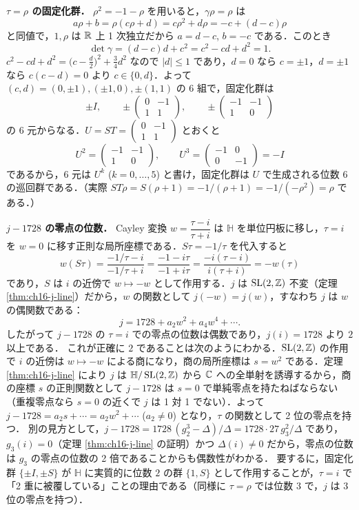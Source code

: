 \textbf{$\tau=\rho$ の固定化群．}
$\rho^2=-1-\rho$ を用いると，$\gamma\rho=\rho$ は
\[
a\rho+b=\rho(c\rho+d)=c\rho^2+d\rho=-c+(d-c)\rho
\]
と同値で，$1,\rho$ は $\mathbb{R}$ 上 1 次独立だから $a=d-c$, $b=-c$ である．このとき
\[
\det\gamma=(d-c)d+c^2=c^2-cd+d^2=1 .
\]
$c^2-cd+d^2=\bigl(c-\tfrac d2\bigr)^2+\tfrac34d^2$ なので $|d|\le1$ であり，$d=0$ なら $c=\pm1$，$d=\pm1$ なら $c(c-d)=0$ より $c\in\{0,d\}$．よって $(c,d)=(0,\pm1),(\pm1,0),\pm(1,1)$ の 6 組で，固定化群は
\[
\pm I,\qquad \pm\begin{pmatrix}0&-1\\1&1\end{pmatrix},\qquad \pm\begin{pmatrix}-1&-1\\1&0\end{pmatrix}
\]
の 6 元からなる．$U=ST=\begin{pmatrix}0&-1\\1&1\end{pmatrix}$ とおくと
\[
U^2=\begin{pmatrix}-1&-1\\1&0\end{pmatrix},\qquad U^3=\begin{pmatrix}-1&0\\0&-1\end{pmatrix}=-I
\]
であるから，6 元は $U^k$ ($k=0,\dots,5$) と書け，固定化群は $U$ で生成される位数 $6$ の巡回群である．（実際 $ST\rho=S(\rho+1)=-1/(\rho+1)=-1/(-\rho^2)=\rho$ である．）

\textbf{$j-1728$ の零点の位数．}
Cayley 変換 $w=\dfrac{\tau-i}{\tau+i}$ は $\mathbb{H}$ を単位円板に移し，$\tau=i$ を $w=0$ に移す正則な局所座標である．$S\tau=-1/\tau$ を代入すると
\[
w(S\tau)=\frac{-1/\tau-i}{-1/\tau+i}=\frac{-1-i\tau}{-1+i\tau}=\frac{-i(\tau-i)}{i(\tau+i)}=-w(\tau)
\]
であり，$S$ は $i$ の近傍で $w\mapsto-w$ として作用する．$j$ は $\operatorname{SL}(2,\mathbb{Z})$ 不変（定理 \ref{thm:ch16-j-line}）だから，$w$ の関数として $j(-w)=j(w)$，すなわち $j$ は $w$ の偶関数である：
\[
j=1728+a_2w^2+a_4w^4+\cdots .
\]
したがって $j-1728$ の $\tau=i$ での零点の位数は偶数であり，$j(i)=1728$ より $2$ 以上である．
これが正確に $2$ であることは次のようにわかる．$\operatorname{SL}(2,\mathbb{Z})$ の作用で $i$ の近傍は $w\mapsto -w$ による商になり，商の局所座標は $s=w^2$ である．定理 \ref{thm:ch16-j-line} により $j$ は $\mathbb{H}/\operatorname{SL}(2,\mathbb{Z})$ から $\mathbb{C}$ への全単射を誘導するから，商の座標 $s$ の正則関数として $j-1728$ は $s=0$ で単純零点を持たねばならない（重複零点なら $s=0$ の近くで $j$ は 1 対 1 でない）．よって $j-1728=a_2s+\cdots=a_2w^2+\cdots$ ($a_2\neq0$) となり，$\tau$ の関数として 2 位の零点を持つ．
別の見方として，$j-1728=1728\,(g_2^3-\Delta)/\Delta=1728\cdot27\,g_3^2/\Delta$ であり，$g_3(i)=0$（定理 \ref{thm:ch16-j-line} の証明）かつ $\Delta(i)\ne0$ だから，零点の位数は $g_3$ の零点の位数の 2 倍であることからも偶数性がわかる．
要するに，固定化群 $\{\pm I,\pm S\}$ が $\mathbb{H}$ に実質的に位数 $2$ の群 $\{1,S\}$ として作用することが，$\tau=i$ で「2 重に被覆している」ことの理由である（同様に $\tau=\rho$ では位数 $3$ で，$j$ は 3 位の零点を持つ）．

